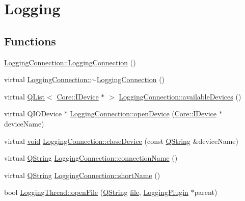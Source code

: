 \hypertarget{group___logging}{\section{Logging}
\label{group___logging}
}
\subsection*{Functions}
\begin{DoxyCompactItemize}
\item 
\hyperlink{group___logging_ga4e4cd5c90f83710ae2807a8257db1c70}{Logging\-Connection\-::\-Logging\-Connection} ()
\item 
virtual \hyperlink{group___logging_ga0d9d6cd072a5b35292b5e4ffeda50fcd}{Logging\-Connection\-::$\sim$\-Logging\-Connection} ()
\item 
virtual \hyperlink{class_q_list}{Q\-List}$<$ \hyperlink{class_core_1_1_i_device}{Core\-::\-I\-Device} $\ast$ $>$ \hyperlink{group___logging_ga0ed63dc5111dcd536bacc7655b878e8f}{Logging\-Connection\-::available\-Devices} ()
\item 
virtual Q\-I\-O\-Device $\ast$ \hyperlink{group___logging_ga592075585208489ed59844d9d7175015}{Logging\-Connection\-::open\-Device} (\hyperlink{class_core_1_1_i_device}{Core\-::\-I\-Device} $\ast$device\-Name)
\item 
virtual \hyperlink{group___u_a_v_objects_plugin_ga444cf2ff3f0ecbe028adce838d373f5c}{void} \hyperlink{group___logging_gaeb291639744d4248ab7422d57444ea0a}{Logging\-Connection\-::close\-Device} (const \hyperlink{group___u_a_v_objects_plugin_gab9d252f49c333c94a72f97ce3105a32d}{Q\-String} \&device\-Name)
\item 
virtual \hyperlink{group___u_a_v_objects_plugin_gab9d252f49c333c94a72f97ce3105a32d}{Q\-String} \hyperlink{group___logging_gaca41f5a7a58289c24cdf4975b9718091}{Logging\-Connection\-::connection\-Name} ()
\item 
virtual \hyperlink{group___u_a_v_objects_plugin_gab9d252f49c333c94a72f97ce3105a32d}{Q\-String} \hyperlink{group___logging_gaf569eb0407d501102e1257c067a05295}{Logging\-Connection\-::short\-Name} ()
\item 
bool \hyperlink{group___logging_gabd55e7242d33b800b73a8ff3fc56deb5}{Logging\-Thread\-::open\-File} (\hyperlink{group___u_a_v_objects_plugin_gab9d252f49c333c94a72f97ce3105a32d}{Q\-String} \hyperlink{uavobjecttemplate_8m_a97c04efa65bcf0928abf9260bc5cbf46}{file}, \hyperlink{class_logging_plugin}{Logging\-Plugin} $\ast$parent)
\item 

\end{DoxyCompactItemize}
